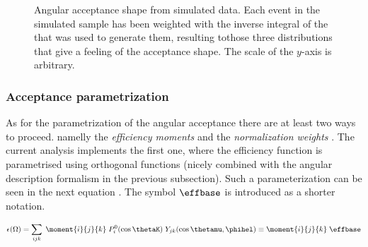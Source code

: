 \begin{figure}[h]
  \centering
  \begin{subfigure}{0.49\textwidth}
    \scalebox{1.3}{}
    \caption{}
    \label{angAcc_ctk}
  \end{subfigure}%
  \hfill%
  \begin{subfigure}{0.49\textwidth}
    \scalebox{1.3}{}
    \caption{}
    \label{angAcc_ctl}
  \end{subfigure}

  \vspace*{0.02\textwidth}
  \begin{subfigure}{0.49\textwidth}
    \scalebox{1.3}{}
    \caption{}
    \label{angAcc_phi}
  \end{subfigure}
  \caption{Angular acceptance shape from simulated data. Each event in the simulated sample has been weighted with the inverse integral 
           of the \pdf that was used to generate them, resulting tothose three distributions that give a feeling of the acceptance shape.
           The scale of the $y$-axis is arbitrary.}
\end{figure}

\subsubsection{Acceptance parametrization}
As for the parametrization of the angular acceptance there are at least two ways to proceed.
namelly the \emph{efficiency moments} \cite{jeroenThesis} and the \emph{normalization weights} \cite{tristanThesis,jeroenThesis}. 
The current analysis implements the first one, where the efficiency function is parametrised using orthogonal functions (nicely
combined with the angular description formalism in the previous subsection). Such a parameterization can be seen in the next equation 
. The symbol $\effbase$ is introduced as a shorter notation.

\begin{center}
\begin{equation}
  \epsilon(\Omega) = \sum_{ijk} \; \moment{i}{j}{k} \; P_i^0(\cos\thetaK) \; Y_{jk}(\cos\thetamu,\phihel) \equiv \moment{i}{j}{k} \; \effbase
  \label{eff_func}
\end{equation}
\end{center}

